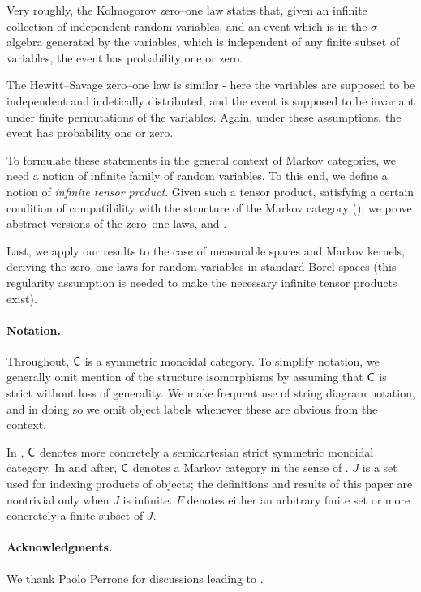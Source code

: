 \documentclass[11pt]{article}
\begin{document}
Very roughly, the Kolmogorov zero--one law states that, given an infinite collection of independent random variables, and an event which is in the $\sigma$-algebra generated by the variables, which is independent of any finite subset of variables, the event has probability one or zero.

The Hewitt--Savage zero--one law is similar - here the variables are supposed to be independent and indetically distributed, and the event is supposed to be invariant under finite permutations of the variables. Again, under these assumptions, the event has probability one or zero.

To formulate these statements in the general context of Markov categories, we need a notion of infinite family of random variables.
To this end, we define a notion of \emph{infinite tensor product}. Given such a tensor product, satisfying a certain condition of compatibility with the structure of the Markov category (), we prove abstract versions of the zero--one laws,  and .

Last, we apply our results to the case of measurable spaces and Markov kernels, deriving the zero--one laws for random variables in standard Borel spaces (this regularity assumption is needed to make the necessary infinite tensor products exist).

\paragraph*{Notation.} 

Throughout, $\mathsf{C}$ is a symmetric monoidal category. To simplify notation, we generally omit mention of the structure isomorphisms by assuming that $\mathsf{C}$ is strict without loss of generality. We make frequent use of string diagram notation, and in doing so we omit object labels whenever these are obvious from the context.

In , $\mathsf{C}$ denotes more concretely a semicartesian strict symmetric monoidal category. In  and after, $\mathsf{C}$ denotes a Markov category in the sense of . $J$ is a set used for indexing products of objects; the definitions and results of this paper are nontrivial only when $J$ is infinite. $F$ denotes either an arbitrary finite set or more concretely a finite subset of $J$.

\paragraph*{Acknowledgments.} We thank Paolo Perrone for discussions leading to .
\end{document}
